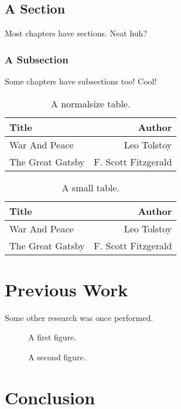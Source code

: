 \documentclass{uicthesi}
\begin{document}
\section{A Section}

Most chapters have sections. Neat huh?

\subsection{A Subsection}

Some chapters have subsections too! Cool!

\begin{table}
\begin{center}
\begin{tabular}{|l|r|}
  \hline 
Title & Author \\
\hline
War And Peace & Leo Tolstoy \\
The Great Gatsby & F. Scott Fitzgerald \\ \hline
\end{tabular}
\caption{A normalsize table.}
\end{center}
\end{table}

\begin{table}
\begin{center}
\caption{A small table.}
\begin{tabular}{|l|r|}
  \hline 
Title & Author \\
\hline
War And Peace & Leo Tolstoy \\
The Great Gatsby & F. Scott Fitzgerald \\ \hline
\end{tabular}
\end{center}
\end{table}

\chapter{Previous Work}

Some other research was once performed.

\begin{figure}
\caption{A first figure.}
\end{figure}

\begin{figure}
\caption{A second figure.}
\end{figure}

\chapter{Conclusion}
\end{document}

